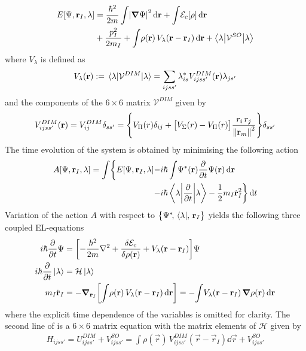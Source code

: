 			\begin{align}
				E[\Psi, \vec{r}_I, \lambda] &= \frac{\hbar^2}{2m}\int\!\abs{\grad \Psi}^2\diff{r}
				+ \int\!{\cal E}_c[\rho]\diff{r} \nonumber \\
				&+ \frac{p^2_I}{2 m_I}
				+ \int\!\rho(\vec{r})\,V_\lambda(\vec{r}-\vec{r}_I)\diff{r}
				+ \ev**{\mathcal{V}^{SO}}{\lambda}
			\end{align}
			where $V_\lambda$ is defined as
			\begin{align}
				V_\lambda(\vec{r}) \vcentcolon= \ev{\mathcal{V}^{DIM}}{\lambda} = \sum_{ijss'}\lambda^*_{is}V^{DIM}_{ijss'}(\vec{r})\lambda_{js'} 
			\end{align}
			and the components of the $6\times6$ matrix ${\mathcal V}^{DIM}$ given by
			\begin{equation}
				V^{DIM}_{ijss'}(\bm{\mathrm{r}})=V^{DIM}_{ij}\delta_{ss'}=\qty{V_\Pi(r)\delta_{ij}+\qty\big[V_\Sigma(r)-V_\Pi(r)]\frac{r_i\,r_j}{\norm{\bm{\mathrm{r}}_m}^2}}\delta_{ss'}
			\end{equation}
			The time evolution of the system is obtained by minimising the following action
			\begin{align}
				A[\Psi,\vec{r}_I,\lambda] = \int\!\bigg\{E[\Psi,\vec{r}_I,\lambda] -&i\hbar\int \!\Psi^*(\vec{r}) \pdv{t}\Psi(\vec{r})\dd{\vec{r}} \nonumber \\
				-&i\hbar\ev**{\pdv{t}}{\lambda} - \frac{1}{2} m_I \dot{\vec{r}}^2_I\bigg\}\dd{t} \label{eq:action}
			\end{align}
			Variation of the action $A$ with respect to $\qty\big{\Psi^*\!,\,\bra\lambda\!,\,\bm{\mathrm{r}}_I}$ yields the following three coupled EL-equations
			\begin{align}
				i\hbar\pdv{t}\Psi &= \qty[-\frac{\hbar^2}{2m}\laplacian +\fdv{\mathcal{E}_c}{\rho(\mathbf{r})} + V_\lambda(\vec{r}-\vec{r}_I)]\Psi \nonumber \\
				i\hbar\pdv{t}\ket\lambda  &= \mathcal{H}\ket\lambda \nonumber \\
				m_I\ddot{\vec{r}}_I &= - \grad_{\vec{r}_I}\qty[\int\!\rho(\vec{r})\,V_\lambda(\vec{r}-\vec{r}_I)\dd{\vec{r}}] = -\!\int\!V_\lambda(\vec{r}-\vec{r}_I)\,\grad\rho(\vec{r})\dd{\vec{r}} \label{eq:dyn-el}
			\end{align}
			where the explicit time dependence of the variables is omitted for clarity. The second line of  is a $6\times 6$ matrix equation with the matrix elements of $\mathcal{H}$ given by
			\begin{align}
				H_{ijss'} = U^{DIM}_{ijss'}+V^{SO}_{ijss'} = \int\!\rho(\vec{r})\,V^{DIM}_{ijss'}(\vec{r}-\vec{r}_I)\dd{\vec{r}}+V^{SO}_{ijss'}
			\end{align}
